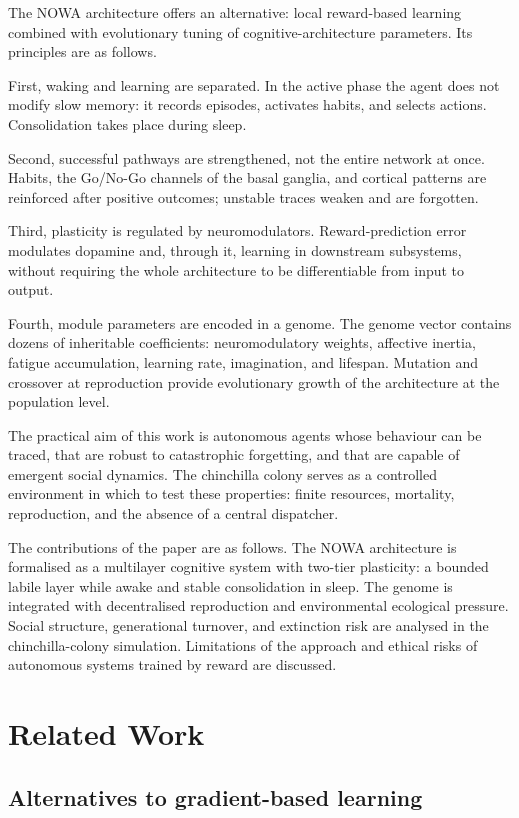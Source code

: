 \documentclass[11pt,a4paper]{article}
\begin{document}
The NOWA architecture offers an alternative: local reward-based learning combined with evolutionary tuning of cognitive-architecture parameters. Its principles are as follows.

First, waking and learning are separated. In the active phase the agent does not modify slow memory: it records episodes, activates habits, and selects actions. Consolidation takes place during sleep.

Second, successful pathways are strengthened, not the entire network at once. Habits, the Go/No-Go channels of the basal ganglia, and cortical patterns are reinforced after positive outcomes; unstable traces weaken and are forgotten.

Third, plasticity is regulated by neuromodulators. Reward-prediction error modulates dopamine and, through it, learning in downstream subsystems, without requiring the whole architecture to be differentiable from input to output.

Fourth, module parameters are encoded in a genome. The genome vector contains dozens of inheritable coefficients: neuromodulatory weights, affective inertia, fatigue accumulation, learning rate, imagination, and lifespan. Mutation and crossover at reproduction provide evolutionary growth of the architecture at the population level.

The practical aim of this work is autonomous agents whose behaviour can be traced, that are robust to catastrophic forgetting, and that are capable of emergent social dynamics. The chinchilla colony serves as a controlled environment in which to test these properties: finite resources, mortality, reproduction, and the absence of a central dispatcher.

The contributions of the paper are as follows. The NOWA architecture is formalised as a multilayer cognitive system with two-tier plasticity: a bounded labile layer while awake and stable consolidation in sleep. The genome is integrated with decentralised reproduction and environmental ecological pressure. Social structure, generational turnover, and extinction risk are analysed in the chinchilla-colony simulation. Limitations of the approach and ethical risks of autonomous systems trained by reward are discussed.

\section{Related Work}

\subsection{Alternatives to gradient-based learning}
\end{document}
